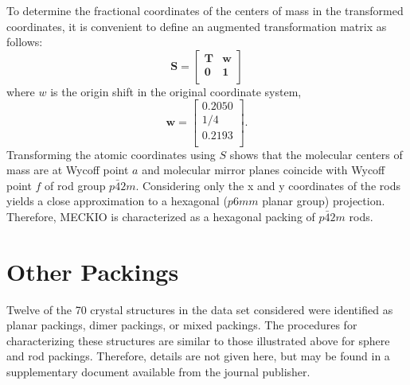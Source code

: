 \documentclass{iucr}              %
\begin{document}
To determine the fractional coordinates of the centers of mass in the transformed coordinates, it is convenient to define an augmented transformation matrix as follows:
\begin{equation}
   \mathbf{S}=\left[
     \begin{array}{cc}
        \mathbf{T}& \mathbf{w}\\
        \mathbf{0}& \mathbf{1}\\
     \end{array}
  \right]
\end{equation}
where $w$ is the origin shift in the original coordinate system,
\begin{equation}
   \mathbf{w}=\left[
     \begin{array}{c}
        0.2050\\
        1/4\\
        0.2193\\
     \end{array}
  \right].
\end{equation}
Transforming the atomic coordinates using $S$ shows that the molecular centers of mass are at Wycoff point $a$ and molecular mirror planes coincide with Wycoff point $f$ of rod group $p\bar{4}2m$.  Considering only the x and y coordinates of the rods yields a close approximation to a hexagonal ($p6mm$ planar group) projection.  Therefore, MECKIO is characterized as a hexagonal packing of $p\bar{4}2m$ rods.


\section{Other Packings}

Twelve of the 70 crystal structures in the data set considered were identified as planar packings, dimer packings, or mixed packings.  The procedures for characterizing these structures are similar to those illustrated above for sphere and rod packings.  Therefore, details are not given here, but may be found in a supplementary document available from the journal publisher.


%

\pagebreak

\end{document}
